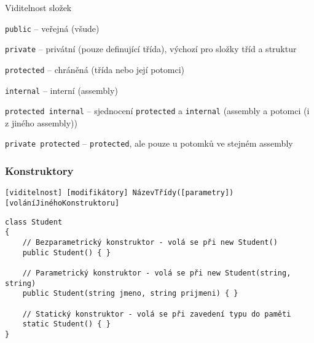 \begin{frame}[fragile]
\begin{bitemize}{Viditelnost složek}
\item \lstinline|public| -- veřejná (všude)
\item \lstinline|private| -- privátní (pouze definující třída), výchozí pro složky tříd a struktur
\item \lstinline|protected| -- chráněná (třída nebo její potomci)
\item \lstinline|internal| -- interní (assembly)
\item \lstinline|protected internal| -- sjednocení \lstinline|protected| a \lstinline|internal| (assembly a potomci (i z jiného assembly))
\item \lstinline|private protected| -- \lstinline|protected|, ale pouze u potomků ve stejném assembly
\end{bitemize}
\end{frame}









\begin{frame}[fragile]
\frametitle{Konstruktory}
\vfill
\begin{noteblock}{}
\begin{lstlisting}
[viditelnost] [modifikátory] NázevTřídy([parametry]) [voláníJinéhoKonstruktoru]
\end{lstlisting}
\end{noteblock}
\vfill
\begin{yesblock}
\begin{lstlisting}[basicstyle=\small]
class Student
{
    // Bezparametrický konstruktor - volá se při new Student()
    public Student() { }

    // Parametrický konstruktor - volá se při new Student(string, string)
    public Student(string jmeno, string prijmeni) { }

    // Statický konstruktor - volá se při zavedení typu do paměti
    static Student() { }
}
\end{lstlisting}
\end{yesblock}
\vfill
\end{frame}


